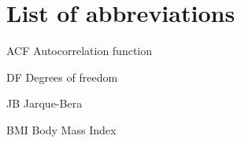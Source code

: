 \section*{List of abbreviations}

\begin{abbrv}
\item[ACF]                   Autocorrelation function
\item[DF]                    Degrees of freedom
\item[JB]                    Jarque-Bera
\item[BMI]                   Body Mass Index
\
\end{abbrv}
